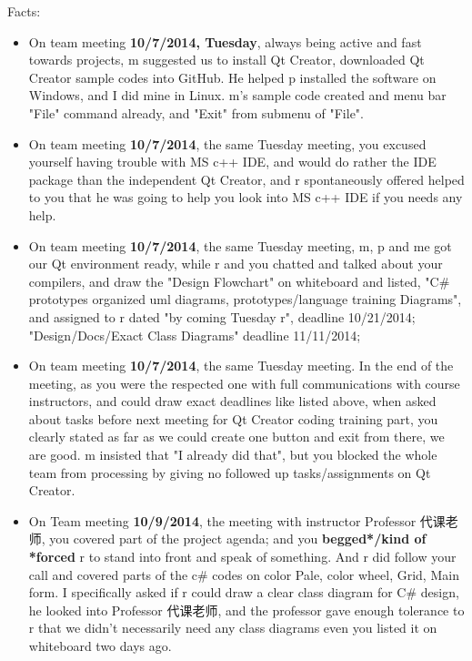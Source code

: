 \documentclass[9pt,b5paper]{article}
\begin{document}
Facts:

\begin{itemize}
\item On team meeting \textbf{10/7/2014, Tuesday}, always being active and fast towards projects, m suggested us to install Qt Creator, downloaded Qt Creator sample codes into GitHub. He helped p installed the software on Windows, and I did mine in Linux. m's sample code created and menu bar "File" command already, and "Exit" from submenu of "File".
\item On team meeting \textbf{10/7/2014}, the same Tuesday meeting, you excused yourself having trouble with MS c++ IDE, and would do rather the IDE package than the independent Qt Creator, and r spontaneously offered helped to you that he was going to help you look into MS c++ IDE if you needs any help.

\item On team meeting \textbf{10/7/2014}, the same Tuesday meeting, m, p and me got our Qt environment ready, while r and you chatted and talked about your compilers, and draw the "Design Flowchart" on whiteboard and listed, "C\# prototypes organized uml diagrams, prototypes/language training Diagrams", and assigned to r dated "by coming Tuesday r", deadline 10/21/2014; "Design/Docs/Exact Class Diagrams" deadline 11/11/2014;

\item On team meeting \textbf{10/7/2014}, the same Tuesday meeting. In the end of the meeting, as you were the respected one with full communications with course instructors, and could draw exact deadlines like listed above, when asked about tasks before next meeting for Qt Creator coding training part, you clearly stated as far as we could create one button and exit from there, we are good. m insisted that "I already did that", but you blocked the whole team from processing by giving no followed up tasks/assignments on Qt Creator.

\item On Team meeting \textbf{10/9/2014}, the meeting with instructor Professor 代课老师, you covered part of the project agenda; and you \textbf{begged*/kind of *forced} r to stand into front and speak of something. And r did follow your call and covered parts of the c\# codes on color Pale, color wheel, Grid, Main form. I specifically asked if r could draw a clear class diagram for C\# design, he looked into Professor 代课老师, and the professor gave enough tolerance to r that we didn't necessarily need any class diagrams even you listed it on whiteboard two days ago.


\end{itemize}
\end{document}
